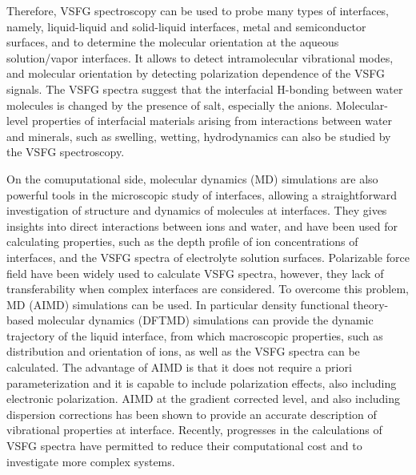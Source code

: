 Therefore, VSFG spectroscopy can be used to probe many types of interfaces, namely, liquid-liquid and 
solid-liquid interfaces\cite{Guyot-Sionnest1987,RS91,DuQ1993,DuQ1994,Richmond2002,Gopalakrishnan2006,ShenYR2006,Morita2008}, metal and semiconductor surfaces\cite{Harris87,Superfine88},
and to determine the molecular orientation at the aqueous solution/vapor interfaces.
It allows to detect intramolecular vibrational modes, and molecular orientation by detecting polarization dependence of the VSFG signals\cite{Vidal05}.  
The VSFG spectra suggest that the interfacial H-bonding between water molecules is changed by the presence of salt, 
especially the anions\cite{Raymond2004}.
Molecular-level properties of interfacial materials arising from interactions between water and minerals, 
such as swelling, wetting, hydrodynamics can also be studied by the VSFG spectroscopy\cite{Rotenberg14}.

On the comuputational side, molecular dynamics (MD) simulations are also powerful tools in the microscopic study of interfaces,
allowing a straightforward investigation of structure and dynamics of molecules at interfaces\cite{Morita2008}.
They gives insights into direct interactions between ions and water, and have been used for calculating properties, 
such as the depth profile of ion concentrations of interfaces\cite{Jungwirth2001,Jungwirth2002}, and the VSFG spectra 
of electrolyte solution surfaces\cite{Gopalakrishnan2006,Johnson2014,Ishiyama2014,Ishiyama2017}.
Polarizable force field have been widely used to calculate VSFG spectra\cite{LXD03,Petersen2004,TI07,MM05}, however, they lack
of transferability when complex interfaces are considered.
To overcome this problem, \abinitio MD (AIMD) simulations\cite{CP1985,Pastore1991,Hutter2012} can be used.
In particular density functional theory-based molecular dynamics (DFTMD) simulations\cite{CP1985,Kuehne2020} 
can provide the dynamic trajectory of 
the liquid interface, from which macroscopic properties, such as distribution and
orientation of ions, as well as the VSFG spectra can be calculated.  
The advantage of AIMD is that it does not require a priori parameterization and it is capable to include polarization effects\cite{Ufimtsev2011},
also including electronic polarization. AIMD at the gradient corrected level, and also including dispersion corrections\cite{Grimme2004,Grimme2006,Grimme2007,Grimme2010,Baer2011}
has been shown to provide an accurate description of vibrational properties at interface\cite{LeeCM2013,LeeCM2015,
Sulpizi2013,Ohto2015,TO15,Fornaro2015, Khatib2016, Nagata2016, Ohto2016, Nagata2016b, Hosseinpour2017,Santos2018,Ohto2018}.
Recently, progresses in the calculations of VSFG spectra have permitted to reduce their computational cost and to investigate more complex systems\cite{Khatib2016b,Khatib2017}.

